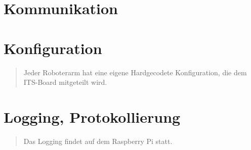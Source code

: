 \begin{quote}
\end{quote}


\section{Kommunikation}

\begin{quote}
\end{quote}

\section{Konfiguration}

\begin{quote}
	Jeder Roboterarm hat eine eigene Hardgecodete Konfiguration, die dem ITS-Board mitgeteilt wird.
\end{quote}

\section{Logging, Protokollierung}

\begin{quote}
	
	Das Logging findet auf dem Raspberry Pi statt.
\end{quote}

%

